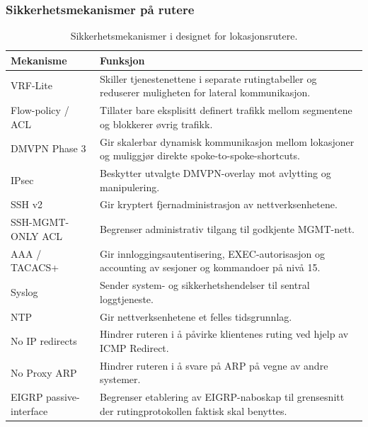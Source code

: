\subsubsection{Sikkerhetsmekanismer på rutere}
\begin{table}[H]
\centering
\caption{Sikkerhetsmekanismer i designet for lokasjonsrutere.}
\vspace{5pt}
\small
\setlength{\tabcolsep}{6pt}
\begin{tabular}{>{\raggedright\arraybackslash}p{3.8cm}>{\raggedright\arraybackslash}p{9.9cm}}
\toprule
\rowcolor{tablegreen}
\color{white}\textbf{Mekanisme} & \color{white}\textbf{Funksjon} \\
\midrule
VRF-Lite &
Skiller tjenestenettene i separate rutingtabeller og reduserer muligheten for lateral kommunikasjon. \\
Flow-policy / ACL &
Tillater bare eksplisitt definert trafikk mellom segmentene og blokkerer øvrig trafikk. \\
DMVPN Phase 3 &
Gir skalerbar dynamisk kommunikasjon mellom lokasjoner og muliggjør direkte spoke-to-spoke-shortcuts. \\
IPsec &
Beskytter utvalgte DMVPN-overlay mot avlytting og manipulering. \\
SSH v2 &
Gir kryptert fjernadministrasjon av nettverksenhetene. \\
SSH-MGMT-ONLY ACL &
Begrenser administrativ tilgang til godkjente MGMT-nett. \\
AAA / TACACS+ &
Gir innloggingsautentisering, EXEC-autorisasjon og accounting av sesjoner og kommandoer på nivå 15. \\
Syslog &
Sender system- og sikkerhetshendelser til sentral loggtjeneste. \\
NTP &
Gir nettverksenhetene et felles tidsgrunnlag. \\
No IP redirects &
Hindrer ruteren i å påvirke klientenes ruting ved hjelp av ICMP Redirect. \\
No Proxy ARP &
Hindrer ruteren i å svare på ARP på vegne av andre systemer. \\
EIGRP passive-interface &
Begrenser etablering av EIGRP-naboskap til grensesnitt der rutingprotokollen faktisk skal benyttes. \\
\bottomrule
\end{tabular}
\label{tab:router-security}
\end{table}

